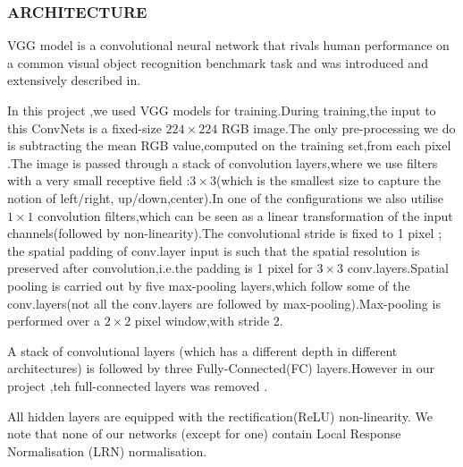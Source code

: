 \documentclass[conference]{IEEEtran}
\begin{document}
\subsubsection{ARCHITECTURE}

VGG model is a convolutional neural network that rivals human performance 
on a common visual object recognition benchmark task and was introduced and 
extensively described in\cite{Simonyan2014Very}. 

In this project ,we used VGG\cite{Simonyan2014Very} models for training.During training,the input
to this ConvNets is a fixed-size $224\times224$ RGB image.The only pre-processing we do is subtracting the mean RGB value,computed on the training set,from each pixel .The image is passed through a stack of 
convolution layers,where we use filters with a very small receptive field
:$3\times 3$(which is the smallest size to capture the notion of left/right,
up/down,center).In one of the configurations we also utilise $1\times1$ convolution filters,which can be seen as a linear transformation of the
input channels(followed by non-linearity).The convolutional stride is fixed 
to 1 pixel ; the spatial padding of conv.layer input is such that the spatial
resolution is preserved after convolution,i.e.the padding is 1 pixel for $3\times 3$ conv.layers.Spatial pooling is carried out by five max-pooling
layers,which follow some of the conv.layers(not all the conv.layers are followed by max-pooling).Max-pooling is performed over a $2\times 2$ pixel 
window,with stride 2.

A stack of convolutional layers (which has a different depth in different 
architectures) is followed by three Fully-Connected(FC) layers.However in our 
project ,teh full-connected layers was removed .

All hidden layers are equipped with the rectification(ReLU) non-linearity.
We note that none of our networks (except for one) contain Local Response
Normalisation (LRN) normalisation.
\end{document}
